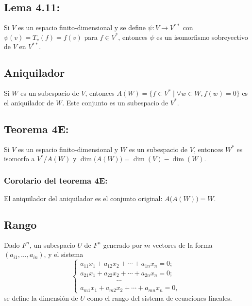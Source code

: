 \documentclass{article}
\begin{document}
\subsection*{\color{blue} Lema 4.11:}

Si $V$ es un espacio finito-dimensional y se define $\psi: V\to V^{**}$ con $\psi(v)=T_v(f)=f(v)$ para $f\in V^*$, entonces $\psi$ es un isomorfismo sobreyectivo de $V$ en $V^{**}$.

\subsection*{\color{violet} Aniquilador}

Si $W$ es un subespacio de $V$, entonces $A(W)=\{f\in V^*\mid \forall w\in W, f(w)=0\}$ es el aniquilador de $W$. Este conjunto es un subespacio de $V^*$.

\newpage
\subsection*{\color{red} Teorema 4E:}

Si $V$ es un espacio finito-dimensional y $W$ es un subespacio de $V$, entonces $W^*$ es isomorfo a $V^*/A(W)$ y $\dim\big(A(W)\big)=\dim(V)-\dim(W)$.

\subsubsection*{\color{red} Corolario del teorema 4E:}

El aniquilador del aniquilador es el conjunto original: $A\big(A(W)\big)=W$.

\subsection*{\color{violet} Rango}

Dado $F^n$, un subespacio $U$ de $F^n$ generado por $m$ vectores de la forma $(a_{i1},\ldots,a_{in})$, y el sistema
$$\begin{cases}
    a_{11}x_1+a_{12}x_2+\cdots+a_{1n}x_n=0; \\
    a_{21}x_1+a_{22}x_2+\cdots+a_{2n}x_n=0; \\
    \hspace{64pt}\cdots\\
    a_{m1}x_1+a_{m2}x_2+\cdots+a_{mn}x_n=0,
  \end{cases}$$
se define la dimensión de $U$ como el rango del sistema de ecuaciones lineales.
\end{document}
